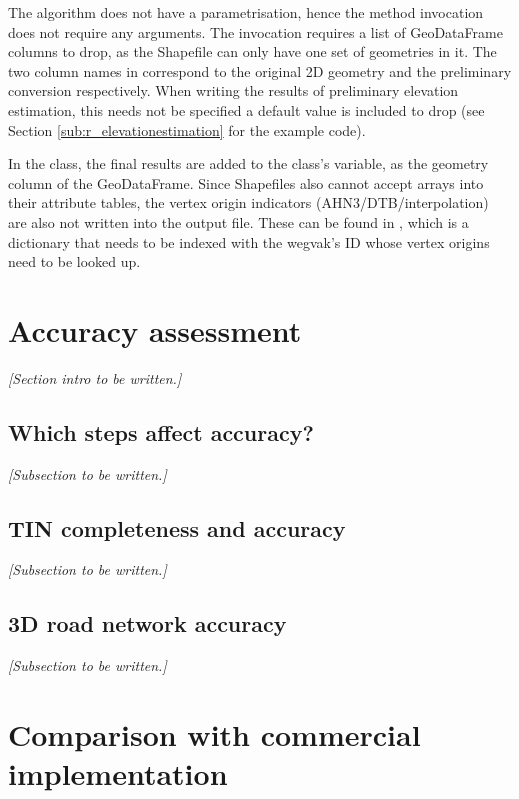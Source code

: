 The algorithm does not have a parametrisation, hence the method invocation does not require any arguments. The  invocation requires a list of GeoDataFrame columns to drop, as the Shapefile can only have one set of geometries in it. The two column names in  correspond to the original 2D geometry and the preliminary conversion respectively. When writing the results of preliminary elevation estimation, this needs not be specified a default value is included to drop  (see Section \ref{sub:r_elevationestimation} for the example code).

In the  class, the final results are added to the class's  variable, as the  geometry column of the GeoDataFrame. Since Shapefiles also cannot accept arrays into their attribute tables, the vertex origin indicators (AHN3/DTB/interpolation) are also not written into the output file. These can be found in , which is a dictionary that needs to be indexed with the wegvak's ID whose vertex origins need to be looked up.

\section{Accuracy assessment}
\label{sec:accuracy}

\textit{[Section intro to be written.]}

\subsection{Which steps affect accuracy?}
\label{sub:accuracysteps}

\textit{[Subsection to be written.]}

\subsection{TIN completeness and accuracy}
\label{sub:accuracytin}

\textit{[Subsection to be written.]}

\subsection{3D road network accuracy}
\label{sub:accuracynwb}

\textit{[Subsection to be written.]}

\section{Comparison with commercial implementation}
\label{sec:comparison}

